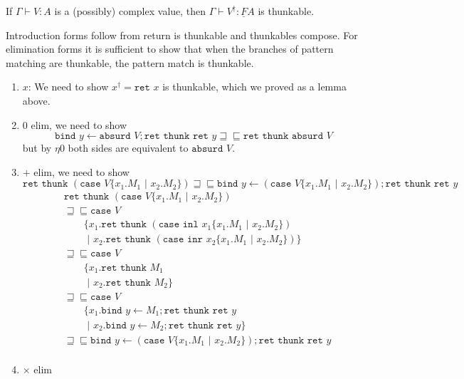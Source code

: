 \documentclass[acmsmall,nonacm]{acmart}
\renewcommand{\u}{\underline}
\newcommand{\pipe}{\,\,|\,\,}
\newcommand{\ltdyn}{\sqsubseteq}
\newcommand{\gtdyn}{\sqsupseteq}
\newcommand{\equidyn}{\mathrel{\gtdyn\ltdyn}}
\newcommand{\simp}[1]{{#1}^{\dag}}
\newcommand{\inl}{\kw{inl}}
\newcommand{\inr}{\kw{inr}}
\newcommand{\bindXtoYinZ}[2]{\kw{bind}#2 \leftarrow #1;}
\newcommand{\case}{\kw{case}}
\newcommand{\kw}[1]{\texttt{#1}\,\,}
\newcommand{\absurd}{\kw{absurd}}
\newcommand{\caseofXthenYelseZ}[3]{\case #1 \{ #2 \pipe #3 \}}
\newcommand{\caseofX}[1]{\case #1}
\newcommand{\thenY}{\{}
\newcommand{\elseZ}[1]{\pipe #1 \}}
\newcommand{\ret}{\kw{ret}}
\newcommand{\thunk}{\kw{thunk}}
\begin{document}
{\begin{longonly}
\begin{lemma}
  If $\Gamma \vdash V : A$ is a (possibly) complex value, then $\Gamma
  \vdash \simp V : \u F A$ is thunkable.
\end{lemma}
\begin{longproof}
  Introduction forms follow from return is thunkable and thunkables
  compose. For elimination forms it is sufficient to show that when
  the branches of pattern matching are thunkable, the pattern match
  is thunkable.
  \begin{enumerate}
  \item $x$: We need to show $\simp x = \ret x$ is thunkable, which we
    proved as a lemma above.
  \item{} $0$ elim, we need to show 
    \[ \bindXtoYinZ {\absurd V} y \ret\thunk\ret y\equidyn \ret\thunk {\absurd V}\]
    but by $\eta0$ both sides are equivalent to $\absurd V$.
  \item{} $+$ elim, we need to show
    \[
    \ret\thunk (\caseofXthenYelseZ V {x_1. M_1} {x_2. M_2})
    \equidyn 
    \bindXtoYinZ {(\caseofXthenYelseZ V {x_1. M_1} {x_2. M_2})} y \ret\thunk \ret y
    \]
    \begin{align*}
      &\ret\thunk (\caseofXthenYelseZ V {x_1. M_1} {x_2. M_2})\\
      &\equidyn
      \caseofX V \tag{$+\eta$}\\
      &\qquad\thenY {x_1. \ret\thunk (\caseofXthenYelseZ {\inl x_1} {x_1. M_1} {x_2. M_2})}\\
      &\qquad\elseZ {x_2. \ret\thunk (\caseofXthenYelseZ {\inr x_2} {x_1. M_1} {x_2. M_2})}\\
      &\equidyn\caseofX V \tag{$+\beta$}\\
      &\qquad\thenY {x_1. \ret\thunk M_1}\\
      &\qquad\elseZ {x_2. \ret\thunk M_2}\\
      &\equidyn\caseofX V \tag{$M_1,M_2$ thunkable}\\
      &\qquad\thenY {x_1. \bindXtoYinZ {M_1} y \ret\thunk\ret y}\\
      &\qquad\elseZ {x_2. \bindXtoYinZ {M_2} y \ret\thunk\ret y}\\
      &\equidyn \bindXtoYinZ {(\caseofXthenYelseZ V {x_1. M_1}{x_2. M_2})} y \ret\thunk\ret y\tag{commuting conversion}\\
    \end{align*}
  \item{} $\times$ elim

\end{enumerate}
\end{longproof}
\end{longonly}}
\end{document}
